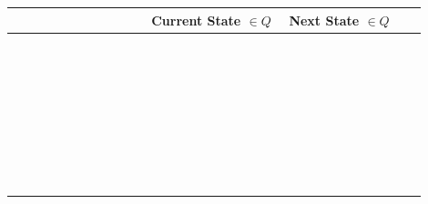 \documentclass{ProblemSetCUNY}
\begin{document}
\centering
\begin{tabular}{>{\centering\arraybackslash}p{0.3\linewidth}|>{\centering\arraybackslash}p{0.3\linewidth}|>{\centering\arraybackslash}p{0.3\linewidth}}
{\centering Input Symbol $\in \Sigma$} & {\centering Current State $\in Q$} & Next State $\in Q$ \\
\toprule
& & \\
& & \\
& & \\
& & \\
& & \\
& & \\
& & \\
& & \\
& & \\
& & \\
& & \\
& & \\
& & \\
& & \\
& & \\
& & \\
& & \\
& & \\
& & \\
& & \\
& & \\
& & \\
& & \\
& & \\
& & \\
& & \\
& & \\
& & \\
& & \\
& & \\
& & \\
& & \\
& & \\
& &
\end{tabular}
\hfill


\pagebreak

%
\end{document}
